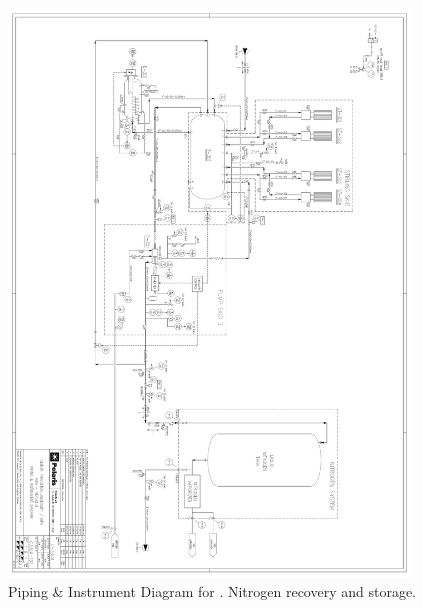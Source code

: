 \begin{figure}[!t]
\centering
\includegraphics[width=0.95\textwidth]{./Figures/Aria_Seruci0_nitrogen_PID.pdf}
\caption[P\& ID of \Aria\ (I)]{Piping \& Instrument Diagram for \SeruciZero. Nitrogen recovery and storage. }
\label{fig:Aria-Column-PandID1}
\end{figure}
